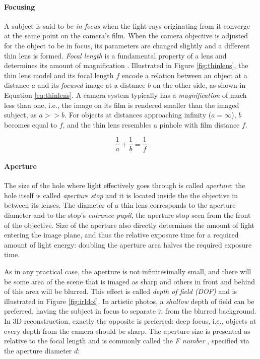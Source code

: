 \paragraph{Focusing}
A subject is said to be \emph{in focus} when the light rays originating from it converge at the same point on the camera's film.
When the camera objective is adjusted for the object to be in focus, its parameters are changed slightly and a different thin lens is formed.
\emph{Focal length} is a fundamental property of a lens and determines its amount of magnification \cite{szeliski10vision,greenleaf1950photographic}.
Illustrated in Figure \ref{fig:thinlens}, the thin lens model and its focal length $f$ encode a relation between an object at a distance $a$ and its \emph{focused} image at a distance $b$ on the other side, as shown in Equation \ref{eq:thinlens}.
A camera system typically has a \emph{magnification} of much less than one, i.e., the image on its film is rendered smaller than the imaged subject, as $a >> b$.
For objects at distances approaching infinity ($a = \infty$), $b$ becomes equal to $f$, and the thin lens resembles a pinhole with film distance $f$.

\begin{equation} \label{eq:thinlens}
	\frac{1}{a} + \frac{1}{b} = \frac{1}{f}
\end{equation}


\paragraph{Aperture}
The size of the hole where light effectively goes through is called \emph{aperture}; the hole itself is called \emph{aperture stop} and it is located inside the the objective in between its lenses.
The diameter of a thin lens corresponds to the aperture diameter and to the stop's \emph{entrance pupil}, the aperture stop seen from the front of the objective.
Size of the aperture also directly determines the amount of light entering the image plane, and thus the relative exposure time for a required amount of light energy: doubling the aperture area halves the required exposure time.
\cite{greenleaf1950photographic}

As in any practical case, the aperture is not infinitesimally small, and there will be some area of the scene that is imaged as sharp and others in front and behind of this area will be blurred.
This effect is called \emph{depth of field (DOF)} and is illustrated in Figure \ref{fig:irldof}.
In artistic photos, a \emph{shallow} depth of field can be preferred, having the subject in focus to separate it from the blurred background.
In 3D reconstruction, exactly the opposite is preferred: deep focus, i.e., objects at every depth from the camera should be sharp.
The aperture size is presented as relative to the focal length and is commonly called the \emph{F number} \cite{szeliski10vision,greenleaf1950photographic}, specified via the aperture diameter $d$:

